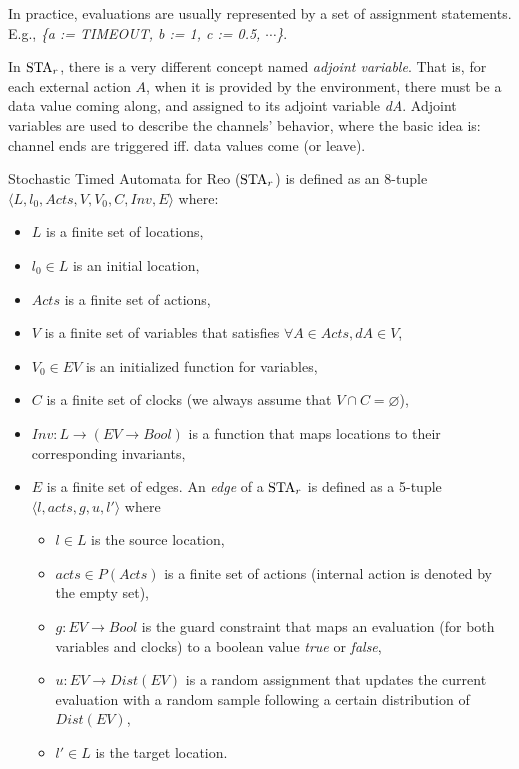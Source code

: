 In practice, evaluations are usually represented by a set of assignment statements. E.g., \emph{\{a := TIMEOUT, b := 1, c := 0.5, $\cdots$\}}.

In $\nSTA$, there is a very different concept named \emph{adjoint variable}. That is, for each external action $A$, when it is provided by the environment, there must be a data value coming along, and assigned to its adjoint variable \emph{dA}. Adjoint variables are used to describe the channels' behavior, where the basic idea is: channel ends are triggered iff. data values come (or leave).

\begin{definition}[$\nSTA$]
Stochastic Timed Automata for Reo ($\nSTA$) is defined as an 8-tuple $\langle L, l_0, Acts, V, V_0, C, Inv, E\rangle$ where:

\begin{itemize}
    \item $L$ is a finite set of locations,
    \item $l_0\in L$ is an initial location,
    \item $Acts$ is a finite set of actions,
    \item $V$ is a finite set of variables that satisfies $\forall A\in Acts, dA\in V$,
    \item $V_0\in EV$ is an initialized function for variables,
    \item $C$ is a finite set of clocks (we always assume that $V\cap C=\varnothing$),
    \item $Inv:L\rightarrow (EV\rightarrow Bool)$ is a function that maps locations to their corresponding invariants,
    \item $E$ is a finite set of edges. An \emph{edge} of a $\nSTA$ is defined as a 5-tuple $\langle l, acts, g, u, l'\rangle$ where
        \begin{itemize}
            \item $l\in L$ is the source location,
            \item $acts\in P(Acts)$ is a finite set of actions (internal action is denoted by the empty set),
            \item $g:EV\rightarrow Bool$ is the guard constraint that maps an evaluation (for both variables and clocks) to a boolean value \emph{true} or \emph{false},
            \item $u:EV\rightarrow Dist(EV)$ is a random assignment that updates the current evaluation with a random sample following a certain distribution of $Dist(EV)$,
            \item $l'\in L$ is the target location.
        \end{itemize}
\end{itemize}
\end{definition}

